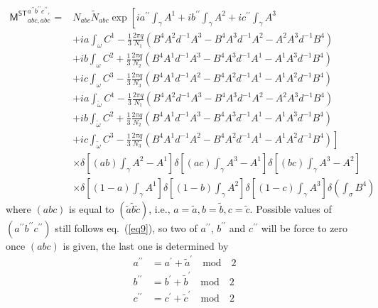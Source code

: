 \documentclass[11pt,nofootinbib,preprint]{revtex4-1}
\begin{document}
\begin{align}
	\mathsf{M^{ST}}_{abc,abc}^{a^{\prime\prime}b^{\prime\prime}c^{\prime\prime},}=&N_{abc}\tilde{N}_{abc}\exp \left[ ia^{\prime\prime}\int_{\gamma}{A^1}+ib^{\prime\prime}\int_{\gamma}{A^2}+ic^{\prime\prime}\int_{\gamma}{A^3} \right. \nonumber 
	\\
	&+ia\int_{\omega}{C^1-\frac{1}{3}\frac{2\pi q}{N_1}\left( B^4A^2d^{-1}A^3-B^4A^3d^{-1}A^2-A^2A^3d^{-1}B^4 \right)} \nonumber
	\\
	&+ib\int_{\omega}{C^2+\frac{1}{3}\frac{2\pi q}{N_2}\left( B^4A^1d^{-1}A^3-B^4A^3d^{-1}A^1-A^1A^3d^{-1}B^4 \right)} \nonumber
	\\
	&+ic\int_{\omega}{C^3-\frac{1}{3}\frac{2\pi q}{N_3}\left( B^4A^1d^{-1}A^2-B^4A^2d^{-1}A^1-A^1A^2d^{-1}B^4 \right)} \nonumber
	\\
	&+ia\int_{\tilde{\omega}}{C^1-\frac{1}{3}\frac{2\pi q}{N_1}\left( B^4A^2d^{-1}A^3-B^4A^3d^{-1}A^2-A^2A^3d^{-1}B^4 \right)} \nonumber
	\\
	&+ib\int_{\tilde{\omega}}{C^2+\frac{1}{3}\frac{2\pi q}{N_2}\left( B^4A^1d^{-1}A^3-B^4A^3d^{-1}A^1-A^1A^3d^{-1}B^4 \right)} \nonumber
	\\
	&+\left. ic\int_{\tilde{\omega}}{C^3-\frac{1}{3}\frac{2\pi q}{N_3}\left( B^4A^1d^{-1}A^2-B^4A^2d^{-1}A^1-A^1A^2d^{-1}B^4 \right)} \right] \nonumber
	\\
	&\times \delta \left[ \left( ab \right) \int_{\gamma}{A^2-A^1} \right] \delta \left[ \left( ac \right) \int_{\gamma}{A^3-A^1} \right] \delta \left[ \left( bc \right) \int_{\gamma}{A^3-A^2} \right] \nonumber
	\\
	&\times \delta \left[ \left( 1-a \right) \int_{\gamma}{A^1} \right] \delta \left[ \left( 1-b \right) \int_{\gamma}{A^2} \right] \delta \left[ \left( 1-c \right) \int_{\gamma}{A^3} \right] \delta \left( \int_{\sigma}{B^4} \right) 
\end{align}
where $\left(abc\right)$ is equal to $\left(\tilde{a}\tilde{b}\tilde{c}\right)$, i.e., $a=\tilde{a},b=\tilde{b},c=\tilde{c}$. Possible values of $\left( a^{\prime\prime}b^{\prime\prime}c^{\prime\prime} \right)$ still follows eq.~(\ref{eq9}), so two of $a^{\prime\prime}$, $b^{\prime\prime}$ and $c^{\prime\prime}$ will be force to zero once $\left( abc \right)$ is given, the last one is determined by 
\begin{align}
	a^{\prime\prime}&=a^{\prime}+\tilde{a}^{\prime} \quad \text{mod} \quad 2 \nonumber 
	\\
	b^{\prime\prime}&=b^{\prime}+\tilde{b}^{\prime} \quad \text{mod} \quad 2 \nonumber 
	\\
	c^{\prime\prime}&=c^{\prime}+\tilde{c}^{\prime} \quad \text{mod} \quad 2 
\end{align}
\end{document}
